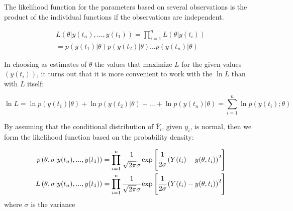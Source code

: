 \documentclass[a4paper,fleqn]{cas-dc}
\begin{document}
%
The likelihood function for the parameters based on several observations is the product of the individual functions if the observations are independent.

{\footnotesize 
	\begin{multline}
		L\left( \theta|y(t_n),...,y(t_1) \right) = \prod_{i=1}^{n} L\left( \theta|y(t_i) \right) \\
		= p\left( y(t_1)| \theta \right)p\left( y(t_2)| \theta \right) ... p\left( y(t_n)| \theta \right)
\end{multline} }

In choosing as estimates of $\theta$ the values that maximize $L$ for the given values $\left( y(t_i) \right)$, it turns out that it is more convenient to work with the $\ln L$ than with $L$ itself:

{\footnotesize 
	\begin{equation}
		\ln L = \ln p \left( y(t_1)| \theta \right) + \ln p\left( y(t_2)| \theta \right) + ... + \ln p \left( y(t_n)| \theta \right) = \sum_{i=1}^{n} \ln p\left( y(t_i); \theta \right)
	\end{equation} }

By assuming that the conditional distribution of $\bar{Y}_i$, given $y_i$, is normal, then we form the likelihood function based on the probability density:

{\footnotesize
	\begin{align} \label{EQ: MLE_Norm}
		p\left(  \theta, \sigma | y(t_n),...,y(t_1) \right) &= \prod_{i=1}^{n} \cfrac{1}{\sqrt{2 \pi} \sigma } \exp \left[ \cfrac{1}{2  \sigma } \left( Y(t_i) - y(\theta , t_i) \right)^2 \right] \nonumber \\
		L\left( \theta, \sigma | y(t_n),...,y(t_1) \right) &= \prod_{i=1}^{n} \cfrac{1}{\sqrt{2 \pi} \sigma } \exp \left[ \cfrac{1}{2  \sigma } \left( Y(t_i) - y(\theta , t_i) \right)^2 \right]
\end{align}}
where $\sigma$ is the variance
\end{document}
